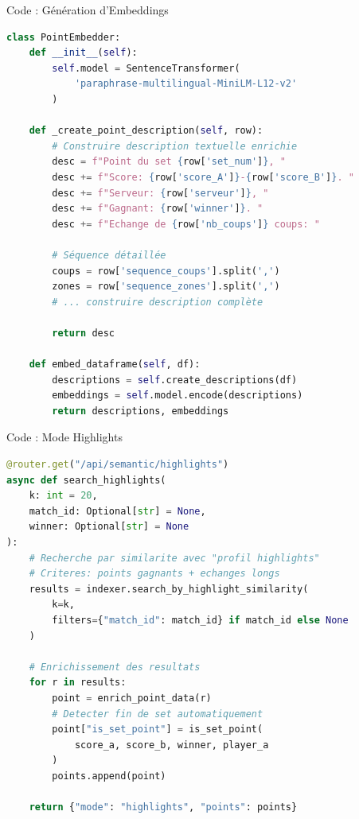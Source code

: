 \documentclass[11pt]{beamer}
\begin{document}
\begin{frame}[fragile]{Code : Génération d'Embeddings}
\begin{lstlisting}[language=Python, caption=Transformation en vecteurs sémantiques]
class PointEmbedder:
    def __init__(self):
        self.model = SentenceTransformer(
            'paraphrase-multilingual-MiniLM-L12-v2'
        )
    
    def _create_point_description(self, row):
        # Construire description textuelle enrichie
        desc = f"Point du set {row['set_num']}, "
        desc += f"Score: {row['score_A']}-{row['score_B']}. "
        desc += f"Serveur: {row['serveur']}, "
        desc += f"Gagnant: {row['winner']}. "
        desc += f"Echange de {row['nb_coups']} coups: "
        
        # Séquence détaillée
        coups = row['sequence_coups'].split(',')
        zones = row['sequence_zones'].split(',')
        # ... construire description complète
        
        return desc
    
    def embed_dataframe(self, df):
        descriptions = self.create_descriptions(df)
        embeddings = self.model.encode(descriptions)
        return descriptions, embeddings
\end{lstlisting}
\end{frame}

\begin{frame}[fragile]{Code : Mode Highlights}
\begin{lstlisting}[language=Python, caption=Détection automatique des meilleurs points]
@router.get("/api/semantic/highlights")
async def search_highlights(
    k: int = 20,
    match_id: Optional[str] = None,
    winner: Optional[str] = None
):
    # Recherche par similarite avec "profil highlights"
    # Criteres: points gagnants + echanges longs
    results = indexer.search_by_highlight_similarity(
        k=k,
        filters={"match_id": match_id} if match_id else None
    )
    
    # Enrichissement des resultats
    for r in results:
        point = enrich_point_data(r)
        # Detecter fin de set automatiquement
        point["is_set_point"] = is_set_point(
            score_a, score_b, winner, player_a
        )
        points.append(point)
    
    return {"mode": "highlights", "points": points}
\end{lstlisting}
\end{frame}
\end{document}
